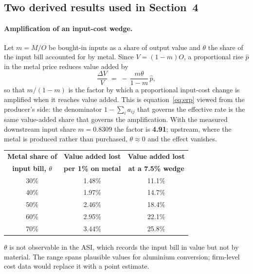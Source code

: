 \subsection{Two derived results used in Section~4}

\paragraph{Amplification of an input-cost wedge.} Let $m = M/O$ be bought-in inputs as
a share of output value and $\theta$ the share of the input bill accounted for by
metal. Since $V = (1-m)O$, a proportional rise $\hat p$ in the metal price reduces
value added by
\begin{equation}
    \frac{\Delta V}{V} \;=\; -\,\frac{m\theta}{1-m}\,\hat p ,
    \label{eq:passthrough}
\end{equation}
so that $m/(1-m)$ is the factor by which a proportional input-cost change is
amplified when it reaches value added. This is equation~\eqref{eq:erp} viewed from
the producer's side: the denominator $1 - \sum_i a_{ij}$ that governs the effective
rate is the same value-added share that governs the amplification. With the measured
downstream input share $m = 0.8309$ the factor is \textbf{4.91}; upstream, where the
metal is produced rather than purchased, $\theta \approx 0$ and the effect vanishes.

\begin{table}[H]
    \centering
    \small
    \begin{tabular}{ccc}
        \toprule
        \textbf{Metal share of} & \textbf{Value added lost} & \textbf{Value added lost} \\
        \textbf{input bill, $\theta$} & \textbf{per 1\% on metal} & \textbf{at a 7.5\% wedge} \\
        \midrule
        30\% & 1.48\% & 11.1\% \\
        40\% & 1.97\% & 14.7\% \\
        50\% & 2.46\% & 18.4\% \\
        60\% & 2.95\% & 22.1\% \\
        70\% & 3.44\% & 25.8\% \\
        \bottomrule
    \end{tabular}

    \vspace{0.15cm}
    \raggedright
    \small $\theta$ is not observable in the ASI, which records the input bill in
    value but not by material. The range spans plausible values for aluminium
    conversion; firm-level cost data would replace it with a point estimate.
\end{table}

